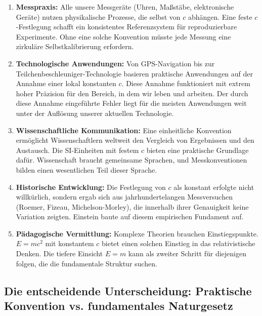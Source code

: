 	\begin{enumerate}[leftmargin=*, label=\textbf{\arabic*.}]
		\item \textbf{Messpraxis:} Alle unsere Messgeräte (Uhren, Maßstäbe, elektronische Geräte) nutzen physikalische Prozesse, die selbst von \( c \) abhängen. Eine feste \( c \)-Festlegung schafft ein konsistentes Referenzsystem für reproduzierbare Experimente. Ohne eine solche Konvention müsste jede Messung eine zirkuläre Selbstkalibrierung erfordern.
		
		\item \textbf{Technologische Anwendungen:} Von GPS-Navigation bis zur Teilchenbeschleuniger-Technologie basieren praktische Anwendungen auf der Annahme einer lokal konstanten \( c \). Diese Annahme funktioniert mit extrem hoher Präzision für den Bereich, in dem wir leben und arbeiten. Der durch diese Annahme eingeführte Fehler liegt für die meisten Anwendungen weit unter der Auflösung unserer aktuellen Technologie.
		
		\item \textbf{Wissenschaftliche Kommunikation:} Eine einheitliche Konvention ermöglicht Wissenschaftlern weltweit den Vergleich von Ergebnissen und den Austausch. Die SI-Einheiten mit festem \( c \) bieten eine praktische Grundlage dafür. Wissenschaft braucht gemeinsame Sprachen, und Messkonventionen bilden einen wesentlichen Teil dieser Sprache.
		
		\item \textbf{Historische Entwicklung:} Die Festlegung von \( c \) als konstant erfolgte nicht willkürlich, sondern ergab sich aus jahrhundertelangen Messversuchen (Roemer, Fizeau, Michelson-Morley), die innerhalb ihrer Genauigkeit keine Variation zeigten. Einstein baute auf diesem empirischen Fundament auf.
		
		\item \textbf{Pädagogische Vermittlung:} Komplexe Theorien brauchen Einstiegspunkte. \( E = mc^2 \) mit konstantem \( c \) bietet einen solchen Einstieg in das relativistische Denken. Die tiefere Einsicht \( E = m \) kann als zweiter Schritt für diejenigen folgen, die die fundamentale Struktur suchen.
	\end{enumerate}
	
	\subsection{Die entscheidende Unterscheidung: Praktische Konvention vs. fundamentales Naturgesetz}
	
